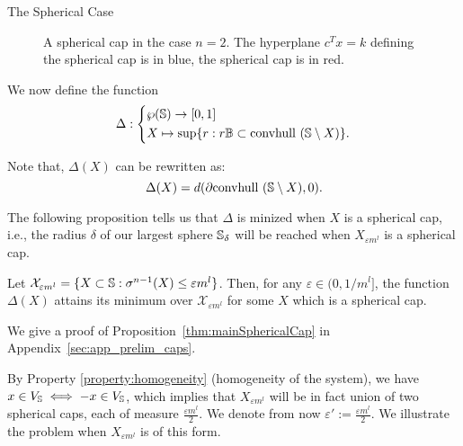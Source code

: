 \begin{subsection}{The Spherical Case}
\begin{figure}[H]
\begin{center}
\end{center}
\caption{A spherical cap in the case $n=2$. The hyperplane $c^Tx =k$ defining the spherical cap is in blue, the spherical cap is in red.}
\end{figure}

We now define the function 
\begin{equation}\label{shrinkage}
\Delta: \left\{
    \begin{split}
    &\wp(\mathbb{S}) \to [0,1]\\ 
    &X \mapsto \sup \{r: r\mathbb{B} \subset \mbox{convhull }(\mathbb{S} \setminus X)\}.
    \end{split}
  \right.
\end{equation}

Note that, $\Delta(X)$ can be rewritten as:
\begin{equation}\label{shrinkage2}
\Delta(X) =  d(\partial  \mbox{convhull }(\mathbb{S} \setminus X), 0).
\end{equation}

The following proposition tells us that $\Delta$ is minized when $X$ is a spherical cap, i.e., the radius $\delta$ of our largest sphere $\mathbb{S}_{\delta}$ will be reached when $X_{\varepsilon m^l}$ is a spherical cap.

\begin{prop}\label{thm:mainSphericalCap}
Let $\mathcal{X}_{\varepsilon m^l} = \{X \subset \mathbb{S}: \sigma^{n-1}(X) \leq \varepsilon m^l\}$. Then, for any $\varepsilon \in (0,1/m^l]$, the function $\Delta(X)$ attains its minimum over $\mathcal{X}_{\varepsilon m^l}$ for some $X$ which is a spherical cap.
\end{prop}

We give a proof of Proposition~\ref{thm:mainSphericalCap} in Appendix~\ref{sec:app_prelim_caps}.

By Property \ref{property:homogeneity} (homogeneity of the system), we have $x \in V_{\mathbb{S}} \iff -x \in V_{\mathbb{S}}$,  which implies that $X_{\varepsilon m^l}$ will be in fact union of two spherical caps, each of measure $\frac{\varepsilon m^l}{2}$. We denote from now $\varepsilon':=\frac{\varepsilon m^l}{2}$. We illustrate the problem when $X_{\varepsilon m^l}$ is of this form.


\end{subsection}
